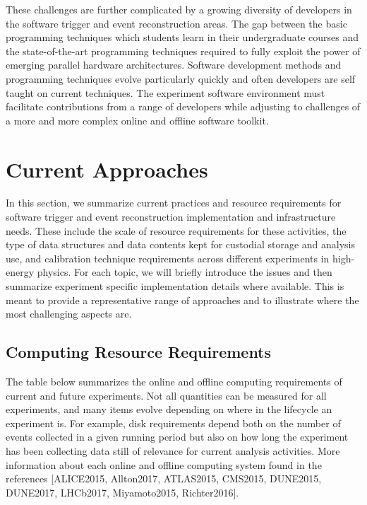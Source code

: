 These challenges are further complicated by a growing diversity of developers in the software trigger and event reconstruction areas. The gap between the basic programming techniques which students learn in their undergraduate courses and the state-of-the-art programming techniques required to fully exploit the power of emerging parallel hardware architectures. Software development methods and programming techniques evolve particularly quickly and often developers are self taught on current techniques. The experiment software environment must facilitate contributions from a range of developers while adjusting to challenges of a more and more complex online and offline software toolkit.

\section{Current Approaches}

In this section, we summarize current practices and resource requirements for software trigger and event reconstruction implementation and infrastructure needs. These include the scale of resource requirements for these activities, the type of data structures and data contents kept for custodial storage and analysis use, and calibration technique requirements across different experiments in high-energy physics. For each topic, we will briefly introduce the issues and then summarize experiment specific implementation details where available. This is meant to provide a representative range of approaches and to illustrate where the most challenging aspects are.

\subsection{Computing Resource Requirements}

The table below summarizes the online and offline computing requirements of current and future experiments. Not all quantities can be measured for all experiments, and many items evolve depending on where in the lifecycle an experiment is. For example, disk requirements depend both on the number of events collected in a given running period but also on how long the experiment has been collecting data still of relevance for current analysis activities. More information about each online and offline computing system found in the references [ALICE2015, Allton2017, ATLAS2015, CMS2015, DUNE2015, DUNE2017, LHCb2017, Miyamoto2015, Richter2016].

